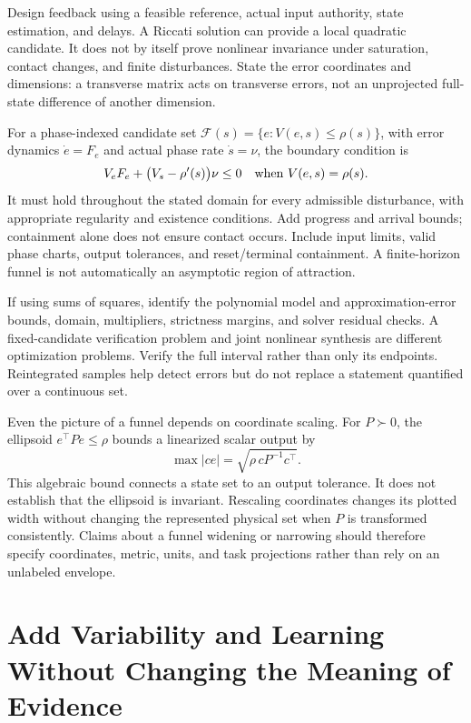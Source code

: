 Design feedback using a feasible reference, actual input authority, state estimation, and delays. A Riccati solution can provide a local quadratic candidate. It does not by itself prove nonlinear invariance under saturation, contact changes, and finite disturbances. State the error coordinates and dimensions: a transverse matrix acts on transverse errors, not an unprojected full-state difference of another dimension.

For a phase-indexed candidate set $\mathcal F(s)=\{e:V(e,s)\leq\rho(s)\}$, with error dynamics $\dot e=F_e$ and actual phase rate $\dot s=\nu$, the boundary condition is
\begin{equation}
V_e F_e+\bigl(V_s-\rho'(s)\bigr)\nu\leq0
\quad\hbox{when }V(e,s)=\rho(s).
\end{equation}
It must hold throughout the stated domain for every admissible disturbance, with appropriate regularity and existence conditions. Add progress and arrival bounds; containment alone does not ensure contact occurs. Include input limits, valid phase charts, output tolerances, and reset/terminal containment. A finite-horizon funnel is not automatically an asymptotic region of attraction.

If using sums of squares, identify the polynomial model and approximation-error bounds, domain, multipliers, strictness margins, and solver residual checks. A fixed-candidate verification problem and joint nonlinear synthesis are different optimization problems. Verify the full interval rather than only its endpoints. Reintegrated samples help detect errors but do not replace a statement quantified over a continuous set.

Even the picture of a funnel depends on coordinate scaling. For $P\succ0$, the ellipsoid $e^\top Pe\leq\rho$ bounds a linearized scalar output by
\begin{equation}
\max |c e|=\sqrt{\rho\,cP^{-1}c^\top} .
\end{equation}
This algebraic bound connects a state set to an output tolerance. It does not establish that the ellipsoid is invariant. Rescaling coordinates changes its plotted width without changing the represented physical set when $P$ is transformed consistently. Claims about a funnel widening or narrowing should therefore specify coordinates, metric, units, and task projections rather than rely on an unlabeled envelope.

\section{Add Variability and Learning Without Changing the Meaning of Evidence}

